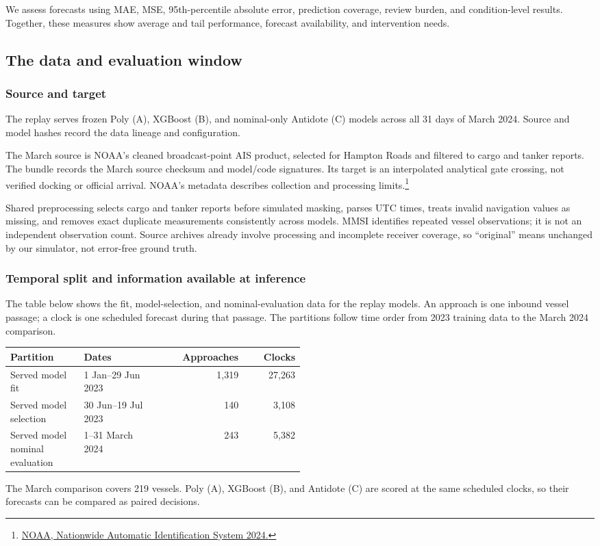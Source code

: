 \documentclass[11pt]{article}
\begin{document}
We assess forecasts using MAE, MSE, 95th-percentile absolute error, prediction coverage, review burden, and condition-level results. Together, these measures show average and tail performance, forecast availability, and intervention needs.

\subsection{The data and evaluation window}
\subsubsection{Source and target}
The replay serves frozen Poly (A), XGBoost (B), and nominal-only Antidote (C) models across all 31 days of March 2024. Source and model hashes record the data lineage and configuration.

The March source is NOAA's cleaned broadcast-point AIS product, selected for Hampton Roads and filtered to cargo and tanker reports. The bundle records the March source checksum and model/code signatures. Its target is an interpolated analytical gate crossing, not verified docking or official arrival. NOAA's metadata describes collection and processing limits.\footnote{\href{https://www.fisheries.noaa.gov/inport/item/73064}{NOAA, Nationwide Automatic Identification System 2024.}}

Shared preprocessing selects cargo and tanker reports before simulated masking, parses UTC times, treats invalid navigation values as missing, and removes exact duplicate measurements consistently across models. MMSI identifies repeated vessel observations; it is not an independent observation count. Source archives already involve processing and incomplete receiver coverage, so ``original'' means unchanged by our simulator, not error-free ground truth.

\subsubsection{Temporal split and information available at inference}
The table below shows the fit, model-selection, and nominal-evaluation data for the replay models. An approach is one inbound vessel passage; a clock is one scheduled forecast during that passage. The partitions follow time order from 2023 training data to the March 2024 comparison.
\begin{longtable}{@{}p{0.25\linewidth}p{0.25\linewidth}rr@{}}
\toprule
Partition & Dates & Approaches & Clocks \\
\midrule
\endhead
Served model fit & 1 Jan--29 Jun 2023 & 1,319 & 27,263 \\
Served model selection & 30 Jun--19 Jul 2023 & 140 & 3,108 \\
Served model nominal evaluation & 1--31 March 2024 & 243 & 5,382 \\
\bottomrule
\end{longtable}
The March comparison covers 219 vessels. Poly (A), XGBoost (B), and Antidote (C) are scored at the same scheduled clocks, so their forecasts can be compared as paired decisions.
\end{document}
